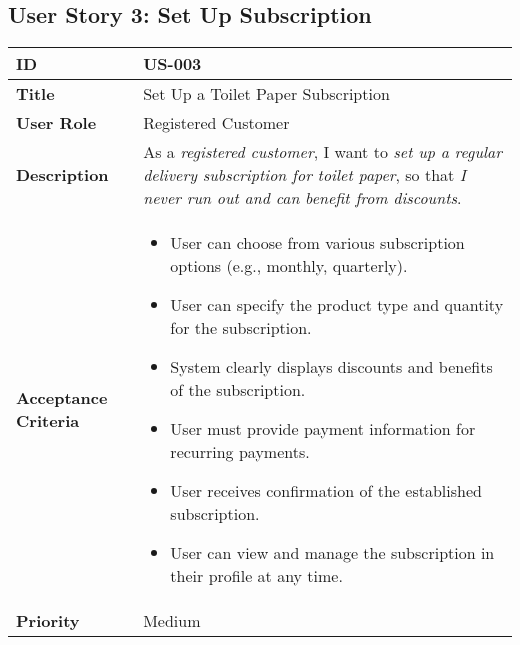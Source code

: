 \documentclass[a4paper,11pt]{article}
\begin{document}
\subsection{User Story 3: Set Up Subscription}
\begin{tabularx}{\textwidth}{|l|X|}
\hline
\textbf{ID} & US-003 \\
\hline
\textbf{Title} & Set Up a Toilet Paper Subscription \\
\hline
\textbf{User Role} & Registered Customer \\
\hline
\textbf{Description} & As a \textit{registered customer}, I want to \textit{set up a regular delivery subscription for toilet paper}, so that \textit{I never run out and can benefit from discounts}. \\
\hline
\textbf{Acceptance Criteria} &
\begin{itemize}[noitemsep, topsep=0pt]
    \item User can choose from various subscription options (e.g., monthly, quarterly).
    \item User can specify the product type and quantity for the subscription.
    \item System clearly displays discounts and benefits of the subscription.
    \item User must provide payment information for recurring payments.
    \item User receives confirmation of the established subscription.
    \item User can view and manage the subscription in their profile at any time.
\end{itemize} \\
\hline
\textbf{Priority} & Medium \\
\hline
\end{tabularx}
\end{document}
